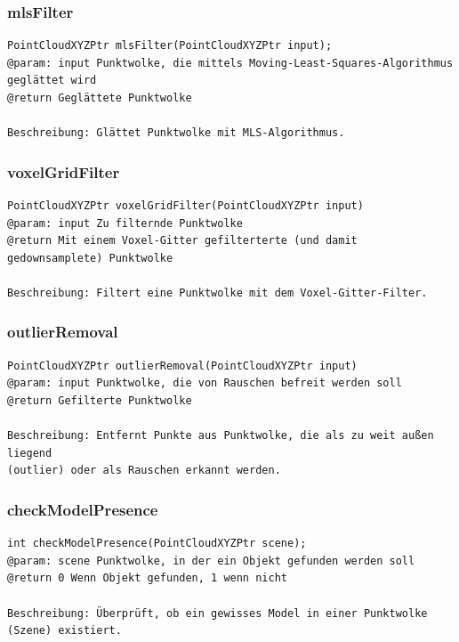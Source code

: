 \documentclass{suturo}
\begin{document}
\subsubsection{mlsFilter}
\begin{verbatim}
PointCloudXYZPtr mlsFilter(PointCloudXYZPtr input);
@param: input Punktwolke, die mittels Moving-Least-Squares-Algorithmus geglättet wird
@return Geglättete Punktwolke

Beschreibung: Glättet Punktwolke mit MLS-Algorithmus.
\end{verbatim}\label{func:mlsfilter}

\subsubsection{voxelGridFilter}
\begin{verbatim}
PointCloudXYZPtr voxelGridFilter(PointCloudXYZPtr input)
@param: input Zu filternde Punktwolke
@return Mit einem Voxel-Gitter gefilterterte (und damit gedownsamplete) Punktwolke

Beschreibung: Filtert eine Punktwolke mit dem Voxel-Gitter-Filter.
\end{verbatim}\label{func:voxelgridfilter}

\subsubsection{outlierRemoval}
\begin{verbatim}
PointCloudXYZPtr outlierRemoval(PointCloudXYZPtr input)
@param: input Punktwolke, die von Rauschen befreit werden soll
@return Gefilterte Punktwolke

Beschreibung: Entfernt Punkte aus Punktwolke, die als zu weit außen liegend
(outlier) oder als Rauschen erkannt werden.
\end{verbatim}\label{func:outlierremoval}

\subsubsection{checkModelPresence}
\begin{verbatim}
int checkModelPresence(PointCloudXYZPtr scene);
@param: scene Punktwolke, in der ein Objekt gefunden werden soll
@return 0 Wenn Objekt gefunden, 1 wenn nicht

Beschreibung: Überprüft, ob ein gewisses Model in einer Punktwolke (Szene) existiert.
\end{verbatim}\label{func:checkmodelpresence}
\end{document}
